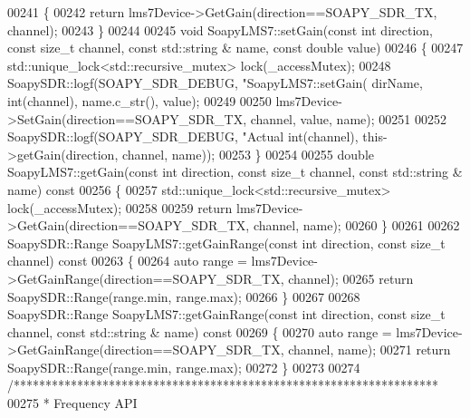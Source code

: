 \begin{DoxyCode}
{{{{{{{{00241 \textcolor{keyword}{}\{
00242     \textcolor{keywordflow}{return} lms7Device->GetGain(direction==SOAPY\_SDR\_TX, channel);
00243 \}
00244 
00245 \textcolor{keywordtype}{void} SoapyLMS7::setGain(\textcolor{keyword}{const} \textcolor{keywordtype}{int} direction, \textcolor{keyword}{const} \textcolor{keywordtype}{size\_t} channel, \textcolor{keyword}{const} std::string &
      name, \textcolor{keyword}{const} \textcolor{keywordtype}{double} value)
00246 \{
00247     std::unique\_lock<std::recursive\_mutex> lock(_accessMutex);
00248     SoapySDR::logf(SOAPY\_SDR\_DEBUG, \textcolor{stringliteral}{"SoapyLMS7::setGain(%
      dirName, \textcolor{keywordtype}{int}(channel), name.c\_str(), value);
00249     
00250     lms7Device->SetGain(direction==SOAPY\_SDR\_TX, channel, value, name);
00251 
00252     SoapySDR::logf(SOAPY\_SDR\_DEBUG, \textcolor{stringliteral}{"Actual %
      int(channel), this->getGain(direction, channel, name));
00253 \}
00254 
00255 \textcolor{keywordtype}{double} SoapyLMS7::getGain(\textcolor{keyword}{const} \textcolor{keywordtype}{int} direction, \textcolor{keyword}{const} \textcolor{keywordtype}{size\_t} channel, \textcolor{keyword}{const} std::string &
      name)\textcolor{keyword}{ const}
00256 \textcolor{keyword}{}\{
00257     std::unique\_lock<std::recursive\_mutex> lock(_accessMutex);
00258 
00259     \textcolor{keywordflow}{return} lms7Device->GetGain(direction==SOAPY\_SDR\_TX, channel, name);
00260 \}
00261 
00262 SoapySDR::Range SoapyLMS7::getGainRange(\textcolor{keyword}{const} \textcolor{keywordtype}{int} direction, \textcolor{keyword}{const} \textcolor{keywordtype}{size\_t} channel)\textcolor{keyword}{ const}
00263 \textcolor{keyword}{}\{
00264     \textcolor{keyword}{auto} range = lms7Device->GetGainRange(direction==SOAPY\_SDR\_TX, channel);
00265     \textcolor{keywordflow}{return} SoapySDR::Range(range.min, range.max);
00266 \}
00267 
00268 SoapySDR::Range SoapyLMS7::getGainRange(\textcolor{keyword}{const} \textcolor{keywordtype}{int} direction, \textcolor{keyword}{const} \textcolor{keywordtype}{size\_t} channel, \textcolor{keyword}{const} std::string &
      name)\textcolor{keyword}{ const}
00269 \textcolor{keyword}{}\{
00270     \textcolor{keyword}{auto} range = lms7Device->GetGainRange(direction==SOAPY\_SDR\_TX, channel, name);
00271     \textcolor{keywordflow}{return} SoapySDR::Range(range.min, range.max);
00272 \}
00273 
00274 \textcolor{comment}{/*******************************************************************}
00275 \textcolor{comment}{ * Frequency API}
}}}}}}}}}}
\end{DoxyCode}
